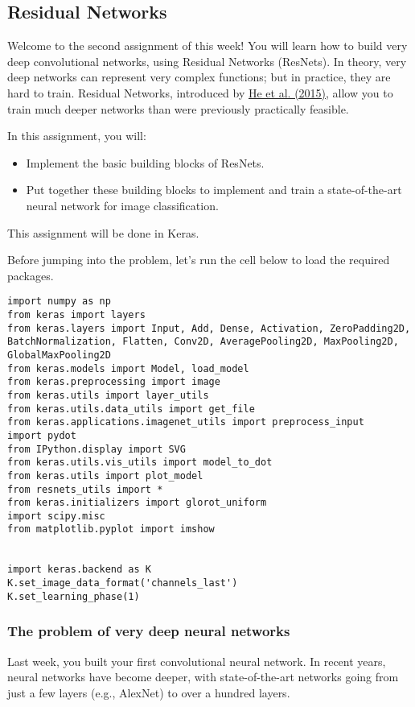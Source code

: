 \subsection{Residual Networks}

Welcome to the second assignment of this week! You will learn how to build very deep convolutional networks, using Residual Networks (ResNets). In theory, very deep networks can represent very complex functions; but in practice, they are hard to train. Residual Networks, introduced by \href{https://arxiv.org/abs/1512.03385}{He et al. (2015)}, allow you to train much deeper networks than were previously practically feasible.

In this assignment, you will:
\begin{itemize}
\item Implement the basic building blocks of ResNets.
\item Put together these building blocks to implement and train a state-of-the-art neural network for image classification.
\end{itemize}

This assignment will be done in Keras.

Before jumping into the problem, let's run the cell below to load the required packages.

\begin{verbatim}
import numpy as np
from keras import layers
from keras.layers import Input, Add, Dense, Activation, ZeroPadding2D, BatchNormalization, Flatten, Conv2D, AveragePooling2D, MaxPooling2D, GlobalMaxPooling2D
from keras.models import Model, load_model
from keras.preprocessing import image
from keras.utils import layer_utils
from keras.utils.data_utils import get_file
from keras.applications.imagenet_utils import preprocess_input
import pydot
from IPython.display import SVG
from keras.utils.vis_utils import model_to_dot
from keras.utils import plot_model
from resnets_utils import *
from keras.initializers import glorot_uniform
import scipy.misc
from matplotlib.pyplot import imshow


import keras.backend as K
K.set_image_data_format('channels_last')
K.set_learning_phase(1)
\end{verbatim}


\subsubsection{The problem of very deep neural networks}

Last week, you built your first convolutional neural network. In recent years, neural networks have become deeper, with state-of-the-art networks going from just a few layers (e.g., AlexNet) to over a hundred layers.


